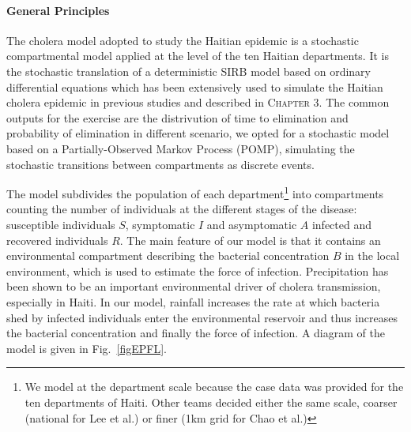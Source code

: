 \paragraph{General Principles}The cholera model adopted to study the Haitian epidemic is a stochastic compartmental model applied at the level of the ten Haitian departments. 
It is the stochastic translation of a deterministic SIRB model based on ordinary differential equations which has been extensively used to simulate the Haitian cholera epidemic in previous studies\cite[-4\baselineskip]{Rinaldo:Reassessment20102011:2012,Bertuzzo:ProbabilityExtinctionHaiti:2016,Pasetto:RealtimeForecastingCholera:2018} and described in \textsc{Chapter 3}. The common outputs for the exercise are the distrivution of time to elimination and probability of elimination in different scenario, we opted for a stochastic  model based on a Partially-Observed Markov Process (POMP), simulating the stochastic transitions between compartments as discrete events\cite{King:InapparentInfectionsCholera:2008}. 

The model subdivides the population of each department\footnote{We model at the department scale because the case data was provided for the ten departments of Haiti. Other teams decided either the same scale, coarser (national for Lee et al.) or finer (1km grid for Chao et al.)} into compartments counting the number of individuals at the different stages of the disease: susceptible individuals $S$, symptomatic $I$ and asymptomatic $A$ infected and recovered individuals $R$. The main feature of our model is that it contains an environmental compartment describing the bacterial concentration $B$ in the local environment, which is used to estimate the force of infection\cite{Rinaldo:Reassessment20102011:2012, Bertuzzo:PredictionSpatialEvolution:2011}. Precipitation has been shown to be an important environmental driver of cholera transmission\cite{Camacho:CholeraEpidemicYemen:2018}, especially in Haiti. In our model, rainfall increases the rate at which bacteria shed by infected individuals enter the environmental reservoir and thus increases the bacterial concentration and finally the force of infection\cite{Lemaitre:RainfallDriverEpidemic:2019}. A diagram of the model is given in Fig.~\ref{figEPFL}.
